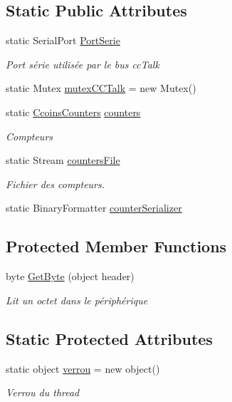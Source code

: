 \subsection*{Static Public Attributes}
\begin{DoxyCompactItemize}
\item 
static Serial\+Port \mbox{\hyperlink{class_device_library_1_1_ccc_talk_acda9f65e6498cce0d3e51ad1b587ede4}{Port\+Serie}}
\begin{DoxyCompactList}\small\item\em Port série utilisée par le bus cc\+Talk \end{DoxyCompactList}\item 
static Mutex \mbox{\hyperlink{class_device_library_1_1_ccc_talk_aabbbe46d911d826c39712d8aecd10786}{mutex\+C\+C\+Talk}} = new Mutex()
\item 
static \mbox{\hyperlink{class_device_library_1_1_ccoins_counters}{Ccoins\+Counters}} \mbox{\hyperlink{class_device_library_1_1_ccc_talk_a3810c0aa448865e19afff87a946fee5d}{counters}}
\begin{DoxyCompactList}\small\item\em Compteurs \end{DoxyCompactList}\item 
static Stream \mbox{\hyperlink{class_device_library_1_1_ccc_talk_ada638d9c9c453de40591720409ef4b54}{counters\+File}}
\begin{DoxyCompactList}\small\item\em Fichier des compteurs. \end{DoxyCompactList}\item 
static Binary\+Formatter \mbox{\hyperlink{class_device_library_1_1_ccc_talk_aa8d3dfce2d2f9f1f2c9ca524d1fbcc8f}{counter\+Serializer}}
\end{DoxyCompactItemize}
\subsection*{Protected Member Functions}
\begin{DoxyCompactItemize}
\item 
byte \mbox{\hyperlink{class_device_library_1_1_ccc_talk_a5f67f62cb03d573225712813348408ad}{Get\+Byte}} (object header)
\begin{DoxyCompactList}\small\item\em Lit un octet dans le périphérique \end{DoxyCompactList}\end{DoxyCompactItemize}
\subsection*{Static Protected Attributes}
\begin{DoxyCompactItemize}
\item 
static object \mbox{\hyperlink{class_device_library_1_1_ccc_talk_a43ca834802480b1171030f7ad063c559}{verrou}} = new object()
\begin{DoxyCompactList}\small\item\em Verrou du thread \end{DoxyCompactList}\end{DoxyCompactItemize}
